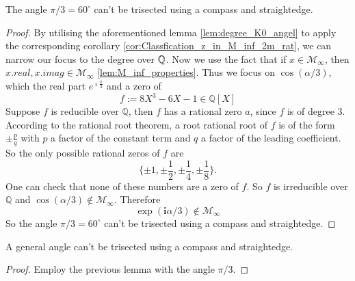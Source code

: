 \begin{lemma}
    \label{lem:pi_third_not_in_M_inf}
    \leanok
    The angle $\pi / 3 = 60^{\circ}$ can't be trisected using a compass and straightedge.
\end{lemma}
\begin{proof}
    \leanok 
    By utilising the aforementioned lemma \ref{lem:degree_K0_angel} to apply the corresponding corollary \ref{cor:Classfication_z_in_M_inf_2m_rat}, we can narrow our focus to the degree over $\mathbb{Q}$.
    Now we use the fact that if $x\in \mathcal{M}_{\infty}$, then $x.real, x.imag \in \mathcal{M}_{\infty}$ \ref{lem:M_inf_properties}. 
    Thus we focus on $\cos(\alpha/3)$, which the real part $e^{\imath \frac{\pi}{3}}$ and a zero of
    \begin{equation*}
        f := 8 X^3 - 6 X - 1 \in \mathbb{Q}[X]
    \end{equation*}
    Suppose $f$ is reducible over $\mathbb{Q}$, then $f$ has a rational zero $a$, since $f$ is of degree $3$. According to the rational root theorem, a root rational root of $f$ is of the form $\pm \frac{p}{q}$ with $p$ a factor of the constant term and $q$ a factor of the leading coefficient. So the only possible rational zeros of $f$ are
     \begin{equation*}
        \{ \pm 1, \pm \frac{1}{2}, \pm \frac{1}{4}, \pm \frac{1}{8} \}.
     \end{equation*}
     One can check that none of these numbers are a zero of $f$.
     So $f$ is irreducible over $\mathbb{Q}$ and $\cos(\alpha/3) \notin \mathcal{M}_{\infty}$.
     Therefore
        \begin{equation*}
            \exp(\textbf{i} \alpha/3) \notin \mathcal{M}_{\infty}
        \end{equation*}
    So the angle $\pi / 3 = 60^{\circ}$ can't be trisected using a compass and straightedge.
\end{proof}

\begin{theorem}
    \label{thm:Angle_not_Trisectable}
    \leanok
    A general angle can't be trisected using a compass and straightedge.
\end{theorem}
\begin{proof}
    \leanok
    Employ the previous lemma with the angle $\pi / 3$.
\end{proof}